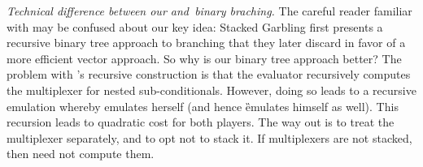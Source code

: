 {\em Technical difference between our and~\HK binary braching.}
The careful reader familiar with \cite{EPRINT:HeaKol20b} may be
confused about our key idea: Stacked Garbling first presents a
recursive binary tree approach to branching that they later
discard in favor of a more efficient vector approach.
So why is our binary tree approach better?
The problem with \cite{EPRINT:HeaKol20b}'s recursive construction
is that the evaluator recursively computes the multiplexer for
nested sub-conditionals.
However, doing so leads to a recursive emulation whereby \E
emulates herself (and hence \G emulates himself as well).
This recursion leads to quadratic cost for both players.
The way out is to treat the multiplexer separately, and to opt not
to stack it.
If multiplexers are not stacked, then \E need not compute them.




